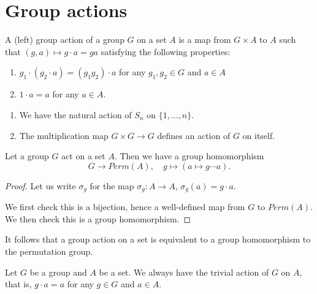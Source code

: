 \section{Group actions}

\begin{defi}
    A (left) group action of a group $G$ on a set $A$ is a map from $G \times A$ to $A$ such that $(g,a) \mapsto g\cdot a = ga$ satisfying the following properties:
    \begin{enumerate}
        \item $g_1\cdot (g_2 \cdot a) = (g_1g_2)\cdot a$ for any $g_1, g_2 \in G$ and $a \in A$
        \item $1 \cdot a = a$ for any $a \in A$.
    \end{enumerate}
\end{defi}

\begin{example}
    \begin{enumerate}
        \item We have the natural action of $S_n$ on $\{1, \dots, n\}$.
        \item The multiplication map $G \times G \rightarrow G$ defines an action of $G$ on itself.
    \end{enumerate}
\end{example}


\begin{prop}
    Let a group $G$ act on a set $A$. Then we have a group homomorphism
    \[
        G \rightarrow Perm(A), \quad g \mapsto (a \mapsto g\cdots a).
    \]
\end{prop}
\begin{proof}
    Let us write $\sigma_g$ for the map $\sigma_g: A \rightarrow A$, $\sigma_g(a) = g\cdot a$.

    We first check this is a bijection, hence a well-defined map from $G$ to $Perm(A)$. We then check this is a group homomorphism.
\end{proof}
\begin{remark}
    It follows that a group action on a set is equivalent to a group homomorphism to the permutation group.
\end{remark}

\begin{example}
    Let $G$ be a group and $A$ be a set. We always have the trivial action of $G$ on $A$, that is, $g\cdot a =a$ for any $g\in G$ and $a\in A$.
\end{example}

